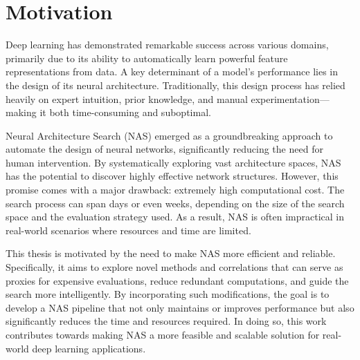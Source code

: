 \section*{Motivation}
Deep learning has demonstrated remarkable success across various domains, primarily due to its ability to automatically learn powerful feature representations from data. A key determinant of a model’s performance lies in the design of its neural architecture. Traditionally, this design process has relied heavily on expert intuition, prior knowledge, and manual experimentation—making it both time-consuming and suboptimal.

Neural Architecture Search (NAS) emerged as a groundbreaking approach to automate the design of neural networks, significantly reducing the need for human intervention. By systematically exploring vast architecture spaces, NAS has the potential to discover highly effective network structures. However, this promise comes with a major drawback: extremely high computational cost. The search process can span days or even weeks, depending on the size of the search space and the evaluation strategy used. As a result, NAS is often impractical in real-world scenarios where resources and time are limited. \cite{Wang_2020_CVPR} 

This thesis is motivated by the need to make NAS more efficient and reliable. Specifically, it aims to explore novel methods and correlations that can serve as proxies for expensive evaluations, reduce redundant computations, and guide the search more intelligently. By incorporating such modifications, the goal is to develop a NAS pipeline that not only maintains or improves performance but also significantly reduces the time and resources required. In doing so, this work contributes towards making NAS a more feasible and scalable solution for real-world deep learning applications.